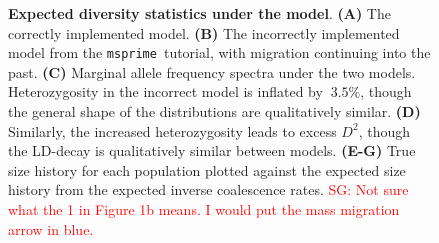 \documentclass{article}
\newcommand{\msprime}[0]{\texttt{msprime}}
\newcommand{\sgcomment}[1]{{\textcolor{red}{SG: #1}}}
\begin{document}
\begin{figure}[ht]
\begin{center}
\caption{\textbf{Expected diversity statistics under the \citet{gutenkunst2009inferring} model}.
    \textbf{(A)} The correctly implemented model.
    \textbf{(B)} The incorrectly implemented model from the \msprime\ tutorial, with migration continuing
    into the past.
    \textbf{(C)} Marginal allele frequency spectra under the two models. Heterozygosity in the incorrect model
    is inflated by $~3.5\%$, though the general shape of the distributions are qualitatively similar.
    \textbf{(D)} Similarly, the increased heterozygosity leads to excess $D^2$, though the LD-decay is
    qualitatively similar between models.
    \textbf{(E-G)} True size history for each population plotted against the expected size history from
    the expected inverse coalescence rates.
    \sgcomment{Not sure what the 1 in Figure 1b means. I would put the mass migration arrow in blue. }
}
\label{fig:ooa_stats}
\end{center}
\end{figure}
\end{document}
